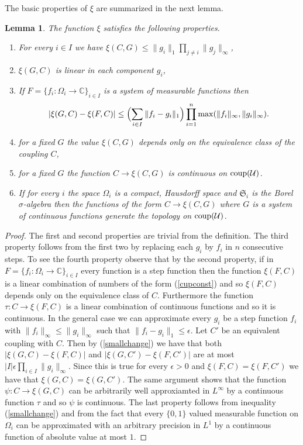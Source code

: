 \documentclass [11pt] {article}
\newtheorem{lemma}{Lemma}[section]
\begin{document}
\bigskip

The basic properties of $\xi$ are summarized in the next lemma.

\begin{lemma}\label{xiprop} The function $\xi$ satisfies the following properties.
\begin{enumerate}
\item For every $i\in I$ we have $\xi(C,G)\leq\|g_i\|_1\prod_{j\neq i}\|g_j\|_\infty$,
\item $\xi(G,C)$ is linear in each component $g_i$,
\item If $F=\{f_i:\Omega_i\rightarrow\mathbb{C}\}_{i\in I}$ is a system of measurable functions then
\begin{equation}\label{smallchange}
|\xi(G,C)-\xi(F,C)|\leq \Bigl(\sum_{i\in I}\|f_i-g_i\|_1\Bigr)\prod_{i=1}^n\max(\|f_i\|_\infty,\|g_i\|_\infty).
\end{equation}
\item for a fixed $G$ the value $\xi(C,G)$ depends only on the equivalence class of the coupling $C$,
\item for a fixed $G$ the function $C\rightarrow\xi(C,G)$ is continuous on ${\rm coup}(\mathcal{U})$.
\item If for every $i$ the space $\Omega_i$ is a compact, Hausdorff space and $\mathfrak{S}_i$ is the Borel $\sigma$-algebra then the functions of the form $C\rightarrow\xi(C,G)$ where $G$ is a system of continuous functions generate the topology on ${\rm coup}(\mathcal{U})$.
\end{enumerate}
\end{lemma}

\begin{proof} The first and second properties are trivial from the definition.
The third property follows from the first two by replacing each $g_i$ by $f_i$ in $n$ consecutive steps. 
To see the fourth property observe that by the second property, if in $F=\{f_i:\Omega_i\rightarrow\mathbb{C}\}_{i\in I}$ every function is a step function then the function $\xi(F,C)$ is a linear combination of numbers of the form (\ref{cupconst}) and so $\xi(F,C)$ depends only on the equivalence class of $C$. Furthermore the function $\tau:C\rightarrow\xi(F,C)$ is a linear combination of continuous functions and so it is continuous. In the general case we can approximate every $g_i$ be a step function $f_i$ with $\|f_i\|_\infty\leq\|g_i\|_\infty$ such that $\|f_i-g_i\|_1\leq\epsilon$. Let $C'$ be an equivalent coupling with $C$. Then by (\ref{smallchange}) we have that both $|\xi(G,C)-\xi(F,C)|$ and $|\xi(G,C')-\xi(F,C')|$ are at most $|I|\epsilon\prod_{i\in I}\|g_i\|_\infty$. Since this is true for every $\epsilon>0$ and $\xi(F,C)=\xi(F,C')$ we have that $\xi(G,C)=\xi(G,C')$. The same argument shows that the function $\psi:C\rightarrow\xi(G,C)$ can be arbitrarily well approxiamted in $L^\infty$ by a continuous function $\tau$ and so $\psi$ is continuous. 
The last property follows from inequality (\ref{smallchange}) and from the fact that every $\{0,1\}$ valued measurable function on $\Omega_i$ can be approximated with an arbitrary precision in $L^1$ by a continuous function of absolute value at most $1$.
\end{proof}
\end{document}
